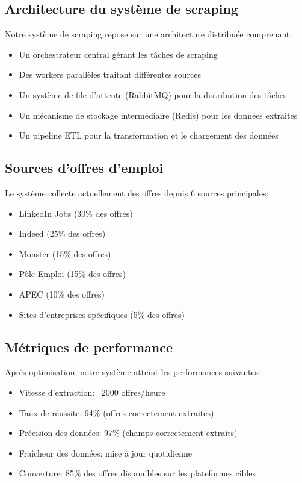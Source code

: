 \documentclass[10pt,a4paper,twocolumn]{article}
\begin{document}
\subsection{Architecture du système de scraping}
Notre système de scraping repose sur une architecture distribuée comprenant:
\begin{itemize}
    \item Un orchestrateur central gérant les tâches de scraping
    \item Des workers parallèles traitant différentes sources
    \item Un système de file d'attente (RabbitMQ) pour la distribution des tâches
    \item Un mécanisme de stockage intermédiaire (Redis) pour les données extraites
    \item Un pipeline ETL pour la transformation et le chargement des données
\end{itemize}

\subsection{Sources d'offres d'emploi}
Le système collecte actuellement des offres depuis 6 sources principales:
\begin{itemize}
    \item LinkedIn Jobs (30\% des offres)
    \item Indeed (25\% des offres)
    \item Monster (15\% des offres)
    \item Pôle Emploi (15\% des offres)
    \item APEC (10\% des offres)
    \item Sites d'entreprises spécifiques (5\% des offres)
\end{itemize}

\subsection{Métriques de performance}
Après optimisation, notre système atteint les performances suivantes:
\begin{itemize}
    \item Vitesse d'extraction: ~2000 offres/heure
    \item Taux de réussite: 94\% (offres correctement extraites)
    \item Précision des données: 97\% (champs correctement extraits)
    \item Fraîcheur des données: mise à jour quotidienne
    \item Couverture: 85\% des offres disponibles sur les plateformes cibles
\end{itemize}
\end{document}

